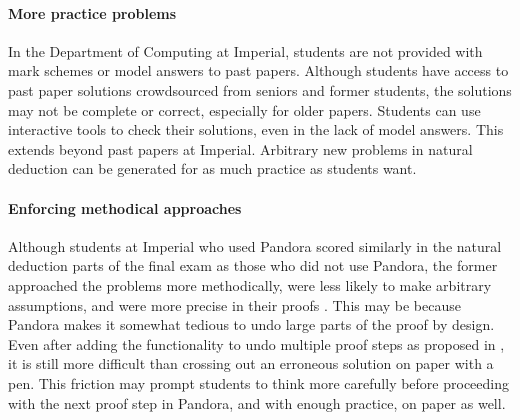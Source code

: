 \paragraph{More practice problems}
In the Department of Computing at Imperial, students are not provided with mark schemes or model answers to past papers. Although students have access to past paper solutions crowdsourced from seniors and former students, the solutions may not be complete or correct, especially for older papers. Students can use interactive tools to check their solutions, even in the lack of model answers. This extends beyond past papers at Imperial. Arbitrary new problems in natural deduction can be generated \cite{ahmed:2013} for as much practice as students want.

\paragraph{Enforcing methodical approaches}
Although students at Imperial who used Pandora scored similarly in the natural deduction parts of the final exam as those who did not use Pandora, the former approached the problems more methodically, were less likely to make arbitrary assumptions, and were more precise in their proofs \cite{pandora:2007}. This may be because Pandora makes it somewhat tedious to undo large parts of the proof by design. Even after adding the functionality to undo multiple proof steps as proposed in \cite{pandora:2007}, it is still more difficult than crossing out an erroneous solution on paper with a pen. This friction may prompt students to think more carefully before proceeding with the next proof step in Pandora, and with enough practice, on paper as well.



